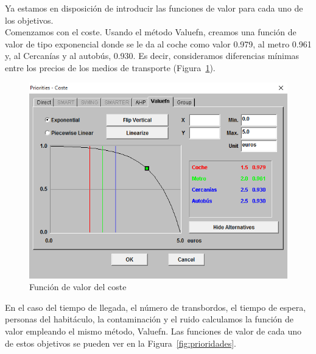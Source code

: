 \documentclass[12pt,a4paper,twoside,openright,titlepage,final]{article}
\begin{document}
Ya estamos en disposición de introducir las funciones de valor para cada uno de los objetivos.\\

Comenzamos con el coste. Usando el método Valuefn, creamos una función de valor de tipo exponencial donde se le da al coche como valor 0.979, al metro 0.961 y, al Cercanías y al autobús, 0.930. Es decir, consideramos diferencias mínimas entre los precios de los medios de transporte (Figura~\ref{fig:prioridades_coste}).\\

\begin{figure}[tbph!]
	\centering
	\includegraphics[width=0.5\linewidth]{imagenes/prioridades_coste}
	\caption{Función de valor del coste}
	\label{fig:prioridades_coste}
\end{figure}

En el caso del tiempo de llegada, el número de transbordos, el tiempo de espera, personas del habitáculo, la contaminación y el ruido calculamos la función de valor empleando el mismo método, Valuefn. Las funciones de valor de cada uno de estos objetivos se pueden ver en la Figura~\ref{fig:prioridades}.\\
\end{document}
